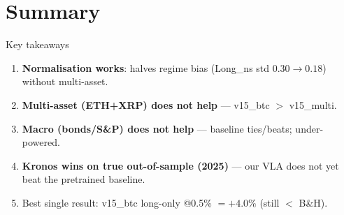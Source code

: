 \documentclass[aspectratio=169]{beamer}
\begin{document}
\section{Summary}
\begin{frame}{Key takeaways}\large
\begin{enumerate}
\item \textbf{Normalisation works}: halves regime bias (Long\_ns std $0.30\!\to\!0.18$) without multi-asset.
\item \textbf{Multi-asset (ETH+XRP) does not help} --- v15\_btc $>$ v15\_multi.
\item \textbf{Macro (bonds/S\&P) does not help} --- baseline ties/beats; under-powered.
\item \textbf{Kronos wins on true out-of-sample (2025)} --- our VLA does not yet beat the pretrained baseline.
\item Best single result: v15\_btc long-only @0.5\% $=+4.0\%$ (still $<$ B\&H).
\end{enumerate}\end{frame}
\end{document}
